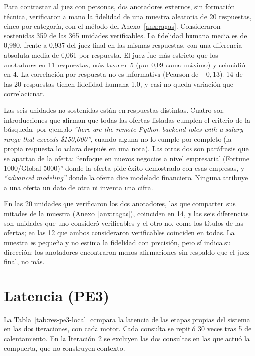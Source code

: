 

Para contrastar al juez con personas, dos anotadores externos, sin formación técnica, verificaron a mano la fidelidad de una muestra aleatoria de 20 respuestas, cinco por categoría, con el método del Anexo~\ref{anx:ragas}. Consideraron sostenidas 359 de las 365 unidades verificables. La fidelidad humana media es de 0,980, frente a 0,937 del juez final en las mismas respuestas, con una diferencia absoluta media de 0,061 por respuesta. El juez fue más estricto que los anotadores en 11 respuestas, más laxo en 5 (por 0,09 como máximo) y coincidió en 4. La correlación por respuesta no es informativa (Pearson de $-0{,}13$): 14 de las 20 respuestas tienen fidelidad humana 1,0, y casi no queda variación que correlacionar.

Las seis unidades no sostenidas están en respuestas distintas. Cuatro son introducciones que afirman que todas las ofertas listadas cumplen el criterio de la búsqueda, por ejemplo \textit{\enquote{here are the remote Python backend roles with a salary range that exceeds \$150,000}}, cuando alguna no lo cumple por completo (la propia respuesta lo aclara después en una nota). Las otras dos son paráfrasis que se apartan de la oferta: \enquote{enfoque en nuevos negocios a nivel empresarial (Fortune 1000/Global 5000)} donde la oferta pide éxito demostrado con esas empresas, y \textit{\enquote{advanced modeling}} donde la oferta dice modelado financiero. Ninguna atribuye a una oferta un dato de otra ni inventa una cifra.

En las 20 unidades que verificaron los dos anotadores, las que comparten sus mitades de la muestra (Anexo~\ref{anx:ragas}), coinciden en 14, y las seis diferencias son unidades que uno consideró verificables y el otro no, como los títulos de las ofertas; en las 12 que ambos consideraron verificables coinciden en todas. La muestra es pequeña y no estima la fidelidad con precisión, pero sí indica su dirección: los anotadores encontraron menos afirmaciones sin respaldo que el juez final, no más.

\section{Latencia (PE3)}
\label{sec:res-pe3}

La Tabla~\ref{tab:res-pe3-local} compara la latencia de las etapas propias del sistema en las dos iteraciones, con cada motor. Cada consulta se repitió 30 veces tras 5 de calentamiento. En la Iteración~2 se excluyen las dos consultas en las que actuó la compuerta, que no construyen contexto.

